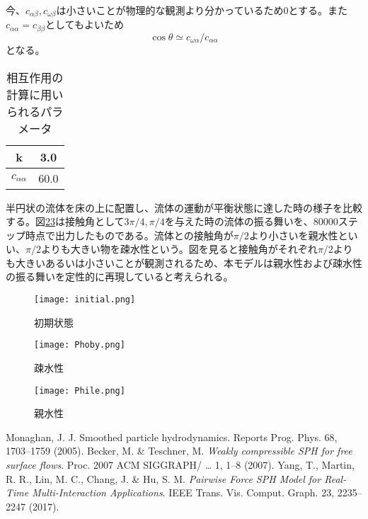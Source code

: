 \documentclass[]{jsarticle}
\begin{document}
今、$c_{\alpha\beta},c_{\omega\beta}$は小さいことが物理的な観測より分かっているため0とする。また$c_{\alpha\alpha}=c_{\beta\beta}$としてもよいため
\begin{equation}
\cos\theta\simeq c_{\omega\alpha}/c_{\alpha\alpha}
\end{equation}
となる。
\begin{table}[h]
  \caption{相互作用の計算に用いられるパラメータ}
  \label{interParam}
  \begin{center}
    \begin{tabular}{|c|c|}\hline
      k&3.0 \\ \hline
      $c_{\alpha\alpha}$ & 60.0 \\ \hline
    \end{tabular}
  \end{center}  
\end{table}

半円状の流体を床の上に配置し、流体の運動が平衡状態に達した時の様子を比較する。図\ref{fig:Phoby}\ref{fig:Phile}は接触角として$3\pi/4, \pi/4$を与えた時の流体の振る舞いを、80000ステップ時点で出力したものである。流体との接触角が$\pi/2$より小さいを親水性といい、$\pi/2$よりも大きい物を疎水性という。図を見ると接触角がそれぞれ$\pi/2$よりも大きいあるいは小さいことが観測されるため、本モデルは親水性および疎水性の振る舞いを定性的に再現していると考えられる。
\begin{figure}[H]
  \centering
  \texttt{[image: initial.png]}
  \caption{初期状態}
  \label{fig:initial}
\end{figure}
\begin{figure}[H]
    \centering
    \texttt{[image: Phoby.png]}
    \caption{疎水性}
    \label{fig:Phoby}
  \end{figure}
  \begin{figure}[H]
    \centering
    \texttt{[image: Phile.png]}
    \caption{親水性}
    \label{fig:Phile}
\end{figure}

\begin{thebibliography}{99}
  Monaghan, J. J. Smoothed particle hydrodynamics. Reports Prog. Phys. 68, 1703–1759 (2005).
  Becker, M. \& Teschner, M. \textit{Weakly compressible SPH for free surface flows}. Proc. 2007 ACM SIGGRAPH/ … 1, 1–8 (2007).
  Yang, T., Martin, R. R., Lin, M. C., Chang, J. \& Hu, S. M.
  \textit{Pairwise Force SPH Model for Real-Time Multi-Interaction Applications}.
  IEEE Trans. Vis. Comput. Graph. 23, 2235–2247 (2017).
\end{thebibliography}
\end{document}
